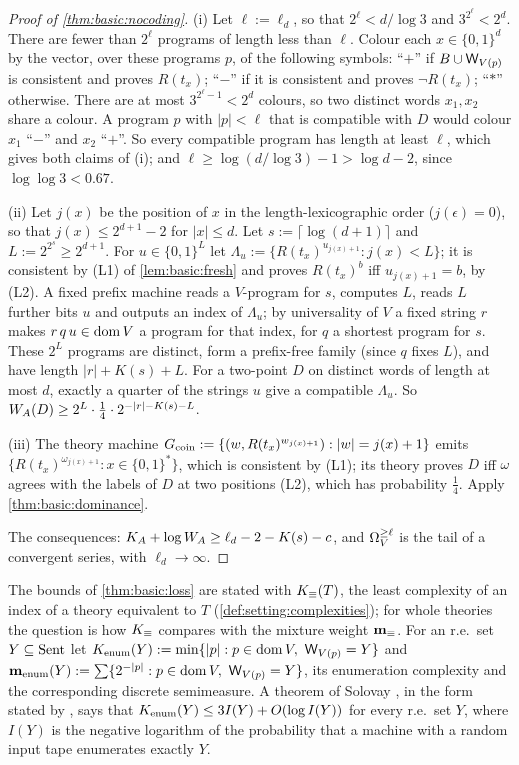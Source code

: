 \begin{proof}[Proof of \cref{thm:basic:nocoding}]
(i) Let $\ell:=\ell_d$, so that $2^\ell<d/\log3$ and $3^{2^\ell}<2^d$. There are fewer than $2^\ell$ programs of length less than $\ell$. Colour each $x\in\{0,1\}^d$ by the vector, over these programs $p$, of the following symbols: ``$+$'' if $B\cup\mathsf{W}_{V(p)}$ is consistent and proves $R(t_x)$; ``$-$'' if it is consistent and proves $\neg R(t_x)$; ``$*$'' otherwise. There are at most $3^{2^\ell-1}<2^d$ colours, so two distinct words $x_1,x_2$ share a colour. A program $p$ with $\lvert p\rvert<\ell$ that is compatible with $D$ would colour $x_1$ ``$-$'' and $x_2$ ``$+$''. So every compatible program has length at least $\ell$, which gives both claims of (i); and $\ell\ge\log(d/\log3)-1>\log d-2$, since $\log\log3<0.67$.

(ii) Let $j(x)$ be the position of $x$ in the length-lexicographic order ($j(\epsilon)=0$), so that $j(x)\le2^{d+1}-2$ for $\lvert x\rvert\le d$. Let $s:=\lceil\log(d+1)\rceil$ and $L:=2^{2^s}\ge2^{d+1}$. For $u\in\{0,1\}^L$ let $\Lambda_u:=\{R(t_x)^{u_{j(x)+1}}:j(x)<L\}$; it is consistent by (L1) of \cref{lem:basic:fresh} and proves $R(t_x)^b$ iff $u_{j(x)+1}=b$, by (L2). A fixed prefix machine reads a $V$-program for $s$, computes $L$, reads $L$ further bits $u$ and outputs an index of $\Lambda_u$; by universality of $V$ a fixed string $r$ makes $r\,q\,u\in\operatorname{dom} V$ a program for that index, for $q$ a shortest program for $s$. These $2^L$ programs are distinct, form a prefix-free family (since $q$ fixes $L$), and have length $\lvert r\rvert+K(s)+L$. For a two-point $D$ on distinct words of length at most $d$, exactly a quarter of the strings $u$ give a compatible $\Lambda_u$. So $W_{A}(D)\ge2^L\cdot\frac14\cdot2^{-\lvert r\rvert-K(s)-L}$.

(iii) The theory machine $G_{\rm coin}:=\{(w,R(t_x)^{w_{j(x)+1}}):\lvert w\rvert=j(x)+1\}$ emits $\{R(t_x)^{\omega_{j(x)+1}}:x\in\{0,1\}^*\}$, which is consistent by (L1); its theory proves $D$ iff $\omega$ agrees with the labels of $D$ at two positions (L2), which has probability $\frac14$. Apply \cref{thm:basic:dominance}.

The consequences: $K_{A}+\log W_{A}\ge\ell_d-2-K(s)-c$, and $\Omega_{V}^{\ge \ell}$ is the tail of a convergent series, with $\ell_d\to\infty$.
\end{proof}

The bounds of \cref{thm:basic:loss} are stated with $K_{\equiv}(T)$, the least complexity of an index of a theory equivalent to $T$ (\cref{def:setting:complexities}); for whole theories the question is how $K_{\equiv}$ compares with the mixture weight $\mathbf{m}_{\equiv}$. For an r.e.\ set $Y\subseteq\mathrm{Sent}$ let $\Kenum(Y):=\min\{\lvert p\rvert:p\in\dom V,\ \re{V(p)}=Y\}$ and $\mmenum(Y):=\sum\{2^{-\lvert p\rvert}:p\in\dom V,\ \re{V(p)}=Y\}$, its enumeration complexity and the corresponding discrete semimeasure. A theorem of Solovay \citep{solovay1977random}, in the form stated by \citet{vereshchagin2007kolmogorov}, says that $K_{\mathrm{enum}}(Y)\le3I(Y)+O(\log I(Y))$ for every r.e.\ set $Y$, where $I(Y)$ is the negative logarithm of the probability that a machine with a random input tape enumerates exactly $Y$.

